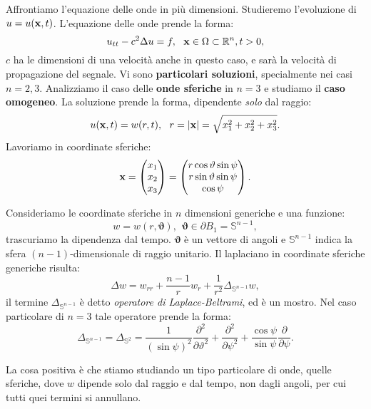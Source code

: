 Affrontiamo l'equazione delle onde in più dimensioni. Studieremo l'evoluzione di $u=u(\mathbf{x} ,t)$. L'equazione delle onde prende la forma:
\begin{equation}
    u_{tt} -c^{2} \Delta u=f,\ \ \mathbf{x} \in \Omega \subset \mathbb{R}^{n} ,t >0,
\end{equation}
$c$ ha le dimensioni di una velocità anche in questo caso, e sarà la velocità di propagazione del segnale. Vi sono \textbf{particolari soluzioni}, specialmente nei casi $n=2,3$. Analizziamo il caso delle \textbf{onde sferiche} in $n=3$ e studiamo il \textbf{caso omogeneo}. La soluzione prende la forma, dipendente \textit{solo} dal raggio:
\begin{equation*}
    u(\mathbf{x} ,t) =w(r,t) ,\ \ r=| \mathbf{x}| =\sqrt{x_{1}^{2} +x_{2}^{2} +x_{3}^{2}} .
\end{equation*}
Lavoriamo in coordinate sferiche:
\begin{equation*}
    \mathbf{x} =
    \begin{pmatrix}
        x_{1} \\
        x_{2} \\
        x_{3}
    \end{pmatrix} =
    \begin{pmatrix}
        r\cos \vartheta \sin \psi \\
        r\sin \vartheta \sin \psi \\
        \cos \psi
    \end{pmatrix} .
\end{equation*}
\begin{nb}
    Consideriamo le coordinate sferiche in $n$ dimensioni generiche e una funzione:
    \begin{equation*}
        w=w(r,\bm{\vartheta }) ,\ \ \bm{\vartheta } \in \partial B_{1} =\mathbb{S}^{n-1} ,
    \end{equation*}
    trascuriamo la dipendenza dal tempo. $\bm{\vartheta }$ è un vettore di angoli e $\mathbb{S}^{n-1}$ indica la sfera $(n-1)$-dimensionale di raggio unitario. Il laplaciano in coordinate sferiche generiche risulta:
    \begin{equation}
        \Delta w=w_{rr} +\frac{n-1}{r} w_{r} +\frac{1}{r^{2}} \Delta _{\mathbb{S}^{n-1}} w,
    \end{equation}
    il termine $\Delta _{\mathbb{S}^{n-1}}$ è detto \textit{operatore di Laplace-Beltrami}, ed è un mostro. Nel caso particolare di $n=3$ tale operatore prende la forma:
    \begin{equation}
        \Delta _{\mathbb{S}^{n-1}} =\Delta _{\mathbb{S}^{2}} =\frac{1}{(\sin \psi)^{2}}\frac{\partial ^{2}}{\partial \vartheta ^{2}} +\frac{\partial ^{2}}{\partial \psi ^{2}} +\frac{\cos \psi }{\sin \psi }\frac{\partial }{\partial \psi } .
    \end{equation}
\end{nb}
La cosa positiva è che stiamo studiando un tipo particolare di onde, quelle sferiche, dove $w$ dipende solo dal raggio e dal tempo, non dagli angoli, per cui tutti quei termini si annullano.

